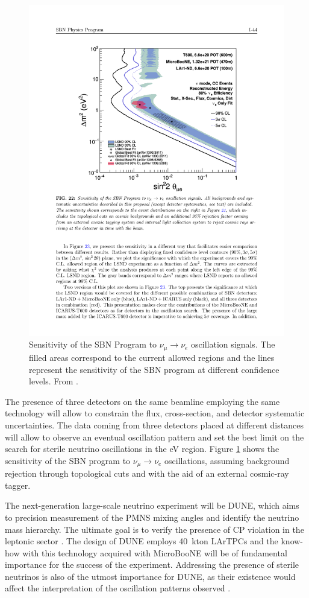 \begin{figure}[htbp]
    \centering
    \includegraphics[width=0.75\linewidth]{figures/sbn_sensitivity.pdf}
    \caption{Sensitivity of the SBN Program to $\nu_{\mu}\rightarrow\nu_e$ oscillation signals. The filled areas correspond to the current allowed regions and the lines represent the sensitivity of the SBN program at different confidence levels. From \cite{Antonello:2015lea}.}
    \label{fig:sbn_sensitivity}
\end{figure}

The presence of three detectors on the same beamline employing the same technology will allow to constrain the flux, cross-section, and detector systematic uncertainties. The data coming from three detectors placed at different distances will allow to observe an eventual oscillation pattern and set the best limit on the search for sterile neutrino oscillations in the eV region. Figure \ref{fig:sbn_sensitivity} shows the sensitivity of the SBN program to $\nu_{\mu}\rightarrow\nu_e$ oscillations, assuming background rejection through topological cuts and with the aid of an external cosmic-ray tagger. 

The next-generation large-scale neutrino experiment will be DUNE, which aims to precision measurement of the PMNS mixing angles and identify the neutrino mass hierarchy. The ultimate goal is to verify the presence of CP violation in the leptonic sector \cite{Acciarri:2015uup}. The design of DUNE employs 40~kton LArTPCs and the know-how with this technology acquired with MicroBooNE will be of fundamental importance for the success of the experiment.
Addressing the presence of sterile neutrinos is also of the utmost importance for DUNE, as their existence would affect the interpretation of the oscillation patterns observed \cite{Gandhi:2015xza}.